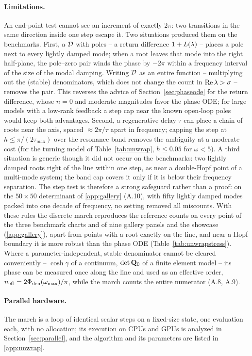 \paragraph{Limitations.} An end-point test cannot see an increment of exactly
$2\pi$: two transitions in the same direction inside one step escape it. Two
situations produced them on the benchmarks. First, a $\mathcal{D}$ with poles -- a
return difference $1+L(\lambda)$ -- places a pole next to every lightly damped
mode; when a root leaves that mode into the right half-plane, the pole--zero
pair winds the phase by $-2\pi$ within a frequency interval of the size of the
modal damping. Writing $\mathcal{D}$ as an entire function -- multiplying out the
(stable) denominators, which does not change the count in
$\operatorname{Re}\lambda>\sigma$ -- removes the pair. This reverses the advice of
Section~\ref{sec:phaseode} for the return difference, whose $n=0$ and moderate
magnitudes favor the phase ODE; for large models with a low-rank feedback a
step cap near the known open-loop poles would keep both advantages. Second, a
regenerative delay $\tau$ can place a chain of roots near the axis, spaced
$\approx2\pi/\tau$ apart in frequency; capping the step at
$h\le\pi/(2\tau_{\max})$ over the resonance band removes the ambiguity at a
moderate cost (for the turning model of Table~\ref{tab:unwrap},
$h\le0.05$ for $\omega<5$). A third situation is generic though it did not
occur on the benchmarks: two lightly damped roots right of the line within
one step, as near a double-Hopf point of a multi-mode system; the band cap
covers it only if it is below their frequency separation. The step test is
therefore a strong safeguard rather than a proof: on the $50\times50$
determinant of \ref{app:gallery} (A.10), with fifty lightly damped
modes packed into one decade of frequency, no setting removed all miscounts.
With these rules the discrete march reproduces the reference counts on every
point of the three benchmark charts and of nine gallery panels and the
showcase (\ref{app:gallery}), apart from points with a root exactly
on the line, and near a Hopf boundary it is more robust than the phase ODE
(Table~\ref{tab:unwrapstress}). Where a parameter-independent, stable
denominator cannot be cleared conveniently -- $\cosh\gamma$ of a continuum,
$\det\mathbf{Q}_0$ of a finite element model -- its phase can be measured once
along the line and used as an effective order,
$n_{\mathrm{eff}}=2\Phi_{\mathrm{den}}(\omega_{\mathrm{max}})/\pi$, while the march counts
the entire numerator (A.8, A.9).

\paragraph{Parallel hardware.} The march is a loop of identical scalar steps
on a fixed-size state, one evaluation each, with no allocation; its execution
on CPUs and GPUs is analyzed in Section~\ref{sec:parallel}, and the algorithm
and its parameters are listed in \ref{app:unwrap}.
